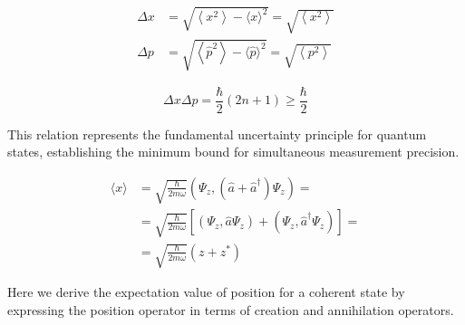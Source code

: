 \documentclass[italian]{HKNdocument}
\begin{document}
\begin{align}
\Delta x & =\sqrt{\left\langle x^{2}\right\rangle-\langle x\rangle^{2}}=\sqrt{\left\langle x^{2}\right\rangle} \\
\Delta p & =\sqrt{\left\langle\hat{p}^{2}\right\rangle-\langle\hat{p}\rangle^{2}}=\sqrt{\left\langle p^{2}\right\rangle}
\end{align}

\begin{equation}
\Delta x \Delta p=\frac{\hbar}{2}(2 n+1) \geq \frac{\hbar}{2}
\end{equation}

This relation represents the fundamental uncertainty principle for quantum states, establishing the minimum bound for simultaneous measurement precision.

\begin{align}
\langle x\rangle & =\sqrt{\frac{\hbar}{2 m \omega}}\left(\Psi_{z},\left(\hat{a}+\hat{a}^{\dagger}\right) \Psi_{z}\right)= \\
& =\sqrt{\frac{\hbar}{2 m \omega}}\left[\left(\Psi_{z}, \hat{a} \Psi_{z}\right)+\left(\Psi_{z}, \hat{a}^{\dagger} \Psi_{z}\right)\right]=  \\
& =\sqrt{\frac{\hbar}{2 m \omega}}\left(z+z^{*}\right)
\end{align}

Here we derive the expectation value of position for a coherent state by expressing the position operator in terms of creation and annihilation operators.
\end{document}
